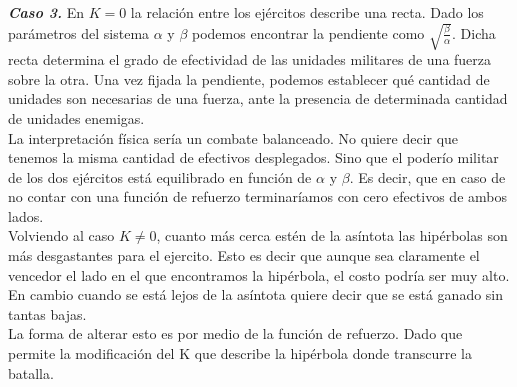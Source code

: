 \documentclass{sig-alternate}
\begin{document}
\textbf{\textit{Caso 3.}} 
En $K=0$ la relación entre los ejércitos describe una recta. Dado los parámetros del sistema $\alpha$ y $\beta$ podemos encontrar la pendiente como $\sqrt{\frac{\beta}{\alpha}}$. Dicha recta determina el grado de efectividad de las unidades militares de una fuerza sobre la otra. Una vez fijada la pendiente, podemos 
establecer qué cantidad de unidades son necesarias de una fuerza, ante la presencia de determinada cantidad de unidades enemigas.  \\
La interpretación f\'isica ser\'ia un combate balanceado. No quiere decir que tenemos la misma cantidad de efectivos desplegados. Sino que el poderío militar de los dos ej\'ercitos está equilibrado en función de $\alpha$ y $\beta$. Es decir, que en caso de no contar con una funci\'on de refuerzo terminar\'iamos con cero efectivos de ambos lados. \\
Volviendo al caso $K \ne 0$, cuanto m\'as cerca est\'en de la as\'intota las hip\'erbolas son m\'as desgastantes para el ejercito. Esto es decir que aunque sea claramente
el vencedor el lado en el que encontramos la hip\'erbola, el costo
podr\'ia ser muy alto. En cambio cuando se está lejos de la as\'intota
quiere decir que se está ganado sin tantas bajas. \\
La forma de alterar esto es por medio de la función de refuerzo. Dado que permite la modificación del K que describe la hipérbola donde transcurre la batalla. 
\end{document}
